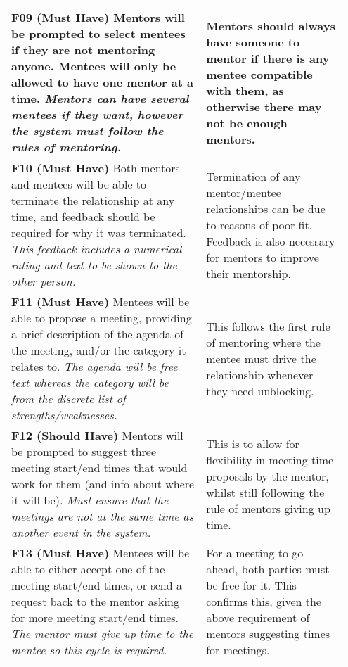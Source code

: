 \documentclass[10pt]{article}
\begin{document}
\begin{longtable}{|p{0.55\linewidth}|p{0.4\linewidth}|}
    \textbf{F09 (Must Have) }
    Mentors will be prompted to select mentees if they are not mentoring anyone.
    Mentees will only be allowed to have one mentor at a time.
    \textit{Mentors can have several mentees if they want, however the system
    must follow the rules of mentoring.}
        &
    Mentors should always have someone to mentor if there is any mentee
    compatible with them, as otherwise there may not be enough mentors.
    \\ \hline

    \textbf{F10 (Must Have) }
    Both mentors and mentees will be able to terminate the relationship at any
    time, and feedback should be required for why it was terminated.
    \textit{This feedback includes a numerical rating and text to be shown to
    the other person.}
        &
    Termination of any mentor/mentee relationships can be due to reasons of poor
    fit. Feedback is also necessary for mentors to improve their mentorship.
    \\ \hline

    \textbf{F11 (Must Have) }
    Mentees will be able to propose a meeting, providing a brief description of
    the agenda of the meeting, and/or the category it relates to.
    \textit{The agenda will be free text whereas the category will be from the
    discrete list of strengths/weaknesses.}
        &
    This follows the first rule of mentoring where the mentee must drive the
    relationship whenever they need unblocking.
    \\ \hline

    \textbf{F12 (Should Have) }
    Mentors will be prompted to suggest three meeting start/end times that would
    work for them (and info about where it will be).
    \textit{Must ensure that the meetings are not at the same time as another
    event in the system.}
        &
    This is to allow for flexibility in meeting time proposals by the mentor,
    whilst still following the rule of mentors giving up time.
    \\ \hline

    \textbf{F13 (Must Have) }
    Mentees will be able to either accept one of the meeting start/end times, or
    send a request back to the mentor asking for more meeting start/end times.
    \textit{The mentor must give up time to the mentee so this cycle is required.}
        &
    For a meeting to go ahead, both parties must be free for it. This confirms
    this, given the above requirement of mentors suggesting times for meetings.
    \\ \hline


\end{longtable}
\end{document}

